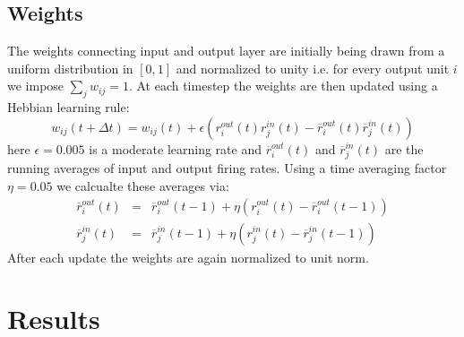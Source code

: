 \documentclass[a4paper, 12pt]{article}
\begin{document}
\subsection{Weights}
The weights connecting input and output layer are initially being drawn from a uniform distribution in $[0,1]$ and normalized to unity i.e. for every output unit $i$ we impose $\sum_jw_{ij}=1$. At each timestep the weights are then updated using a Hebbian learning rule:  
\begin{equation}
w_{ij}(t+\Delta t)= w_{ij}(t)+ \epsilon(r_i^{out}(t)r_j^{in}(t)-\overline{r}_i^{out}(t)\overline{r}_j^{in}(t))
\end{equation}
here  $\epsilon= 0.005$ is a moderate learning rate and $\overline{r}_i^{out}(t)$ and $\overline{r}_j^{in}(t)$ are the  running averages of input and output firing rates. Using a time averaging factor $\eta=0.05$ we calcualte these averages via: 
	\begin{eqnarray}
	\overline{r}_i^{out}(t) &=& \overline{r}_i^{out}(t-1)+ \eta(r_i^{out}(t)-\overline{r}_i^{out}(t-1))\\
	\overline{r}_j^{in}(t) &=& \overline{r}_j^{in}(t-1)+ \eta(r_j^{in}(t)-\overline{r}_j^{in}(t-1))
	\end{eqnarray}
After each update the weights are again normalized to unit norm. 
%
%
\section{Results}
%
\end{document}
